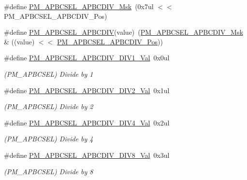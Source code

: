 \begin{DoxyCompactItemize}
\#define \mbox{\hyperlink{group___s_a_m_d21___p_m_ga2619287494a45aef81eafed63ea8463d}{P\+M\+\_\+\+A\+P\+B\+C\+S\+E\+L\+\_\+\+A\+P\+B\+C\+D\+I\+V\+\_\+\+Msk}}~(0x7ul $<$$<$ P\+M\+\_\+\+A\+P\+B\+C\+S\+E\+L\+\_\+\+A\+P\+B\+C\+D\+I\+V\+\_\+\+Pos)
\item 
\#define \mbox{\hyperlink{group___s_a_m_d21___p_m_ga5f10c12c31b1fe15eee55ac128eaeb7e}{P\+M\+\_\+\+A\+P\+B\+C\+S\+E\+L\+\_\+\+A\+P\+B\+C\+D\+IV}}(value)~(\mbox{\hyperlink{group___s_a_m_d21___p_m_ga2619287494a45aef81eafed63ea8463d}{P\+M\+\_\+\+A\+P\+B\+C\+S\+E\+L\+\_\+\+A\+P\+B\+C\+D\+I\+V\+\_\+\+Msk}} \& ((value) $<$$<$ \mbox{\hyperlink{group___s_a_m_d21___p_m_ga4a8379c87e542ce1f35e688187aac873}{P\+M\+\_\+\+A\+P\+B\+C\+S\+E\+L\+\_\+\+A\+P\+B\+C\+D\+I\+V\+\_\+\+Pos}}))
\item 
\#define \mbox{\hyperlink{group___s_a_m_d21___p_m_ga765ff4e686958dbc7632b65e5f41e194}{P\+M\+\_\+\+A\+P\+B\+C\+S\+E\+L\+\_\+\+A\+P\+B\+C\+D\+I\+V\+\_\+\+D\+I\+V1\+\_\+\+Val}}~0x0ul
\begin{DoxyCompactList}\small\item\em (P\+M\+\_\+\+A\+P\+B\+C\+S\+EL) Divide by 1 \end{DoxyCompactList}\item 
\#define \mbox{\hyperlink{group___s_a_m_d21___p_m_ga5851df079a899ab86eeacb5ea31a5f0b}{P\+M\+\_\+\+A\+P\+B\+C\+S\+E\+L\+\_\+\+A\+P\+B\+C\+D\+I\+V\+\_\+\+D\+I\+V2\+\_\+\+Val}}~0x1ul
\begin{DoxyCompactList}\small\item\em (P\+M\+\_\+\+A\+P\+B\+C\+S\+EL) Divide by 2 \end{DoxyCompactList}\item 
\#define \mbox{\hyperlink{group___s_a_m_d21___p_m_ga7b652bc91ccaa93868364c00af432d6d}{P\+M\+\_\+\+A\+P\+B\+C\+S\+E\+L\+\_\+\+A\+P\+B\+C\+D\+I\+V\+\_\+\+D\+I\+V4\+\_\+\+Val}}~0x2ul
\begin{DoxyCompactList}\small\item\em (P\+M\+\_\+\+A\+P\+B\+C\+S\+EL) Divide by 4 \end{DoxyCompactList}\item 
\#define \mbox{\hyperlink{group___s_a_m_d21___p_m_gace5dfb40f2f3fdef3a50e0b02053b19f}{P\+M\+\_\+\+A\+P\+B\+C\+S\+E\+L\+\_\+\+A\+P\+B\+C\+D\+I\+V\+\_\+\+D\+I\+V8\+\_\+\+Val}}~0x3ul
\begin{DoxyCompactList}\small\item\em (P\+M\+\_\+\+A\+P\+B\+C\+S\+EL) Divide by 8 \end{DoxyCompactList}\item 

\end{DoxyCompactItemize}
